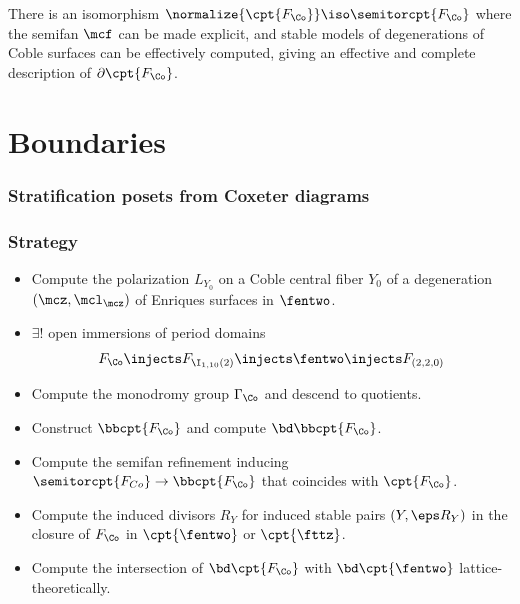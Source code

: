 \documentclass{beamer}
\begin{document}
{\begin{frame}
\begin{conjecture}
There is an isomorphism $\normalize{\cpt{F _{\Co}}} \iso \semitorcpt{F_{\Co}}$ where the semifan $\mcf$ can be made explicit, and stable models of degenerations of Coble surfaces can be effectively computed, giving an effective and complete description of $\partial \cpt{F_{\Co}}$.
\end{conjecture}

\end{frame}
\section{Boundaries}
\begin{frame}
\end{frame}
\begin{frame}\frametitle{Stratification posets from Coxeter diagrams}
\end{frame}

\begin{frame}\frametitle{Strategy}
{\small
\begin{itemize}
\item Compute the polarization $L_{Y_0}$ on a Coble central fiber $Y_0$ of a degeneration $(\mcz, \mcl_{\mcz} )$ of Enriques surfaces in $\fentwo$.
\item $\exists !$ open immersions of period domains
\[ F_{\Co} \injects F_{\I_{1, 10}(2)} \injects \fentwo \injects F_{(2,2,0)} \]
\item Compute the monodromy group $\Gamma_{\Co}$ and descend to quotients.
\item Construct $\bbcpt{F_{\Co}}$ and compute $\bd \bbcpt{F_{\Co}}$.
\item Compute the semifan refinement inducing $\semitorcpt{F_{Co}} \to \bbcpt{F_{\Co}}$ that coincides with $\cpt{F_{\Co}}$.
\item Compute the induced divisors $R_Y$ for induced stable pairs $(Y, \eps R_Y)$ in the closure of $F_{\Co}$ in $\cpt{\fentwo}$ or $\cpt{\fttz}$.
\item Compute the intersection of $\bd \cpt{F_{\Co}}$ with $\bd \cpt{\fentwo}$ lattice-theoretically.
\end{itemize}
}
\end{frame}

}
\end{document}
